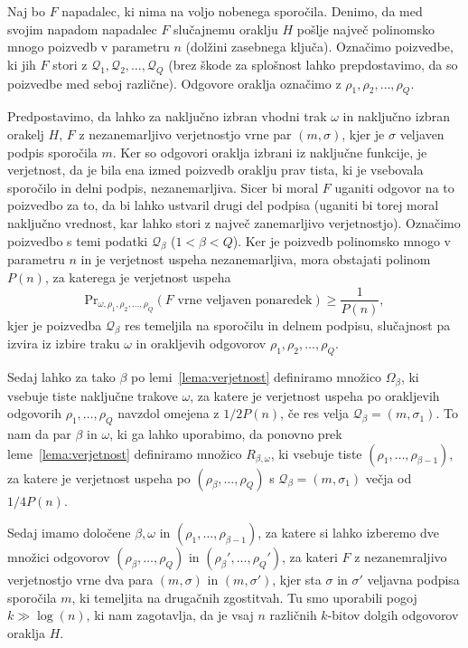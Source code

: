 \documentclass[isrm2, tisk]{fmfdelo}
\begin{document}
\begin{dokaz}
    Naj bo $F$ napadalec, ki nima na voljo nobenega sporočila. Denimo, da med svojim napadom napadalec
    $F$ slučajnemu oraklju $H$ pošlje največ polinomsko mnogo poizvedb v parametru $n$ (dolžini
    zasebnega ključa). Označimo  poizvedbe, ki jih $F$ stori z $\mathcal{Q}_1, \mathcal{Q}_2, \dots,
    \mathcal{Q}_Q$ (brez škode za splošnost lahko prepdostavimo, da so poizvedbe med seboj različne).
    Odgovore oraklja označimo  z $\rho_1, \rho_2 , \dots, \rho_Q$.

    Predpostavimo, da lahko za naključno izbran vhodni trak $\omega$ in naključno izbran orakelj $H$,
    $F$ z nezanemarljivo verjetnostjo vrne par $(m, \sigma)$, kjer je $\sigma$ veljaven podpis
    sporočila $m$. Ker so odgovori oraklja izbrani iz naključne funkcije, je verjetnost, da je bila
    ena izmed poizvedb oraklju prav tista, ki je vsebovala sporočilo in delni podpis, nezanemarljiva.
    Sicer bi moral $F$ uganiti odgovor na to poizvedbo za to, da bi lahko ustvaril drugi del podpisa
    (uganiti bi torej moral naključno vrednost, kar lahko stori z največ zanemarljivo verjetnostjo).
    Označimo poizvedbo s temi podatki $\mathcal{Q}_\beta$ ($1 < \beta < Q$). Ker je poizvedb polinomsko
    mnogo v parametru $n$ in je verjetnost uspeha nezanemarljiva, mora obstajati polinom $P(n)$, za
    katerega je verjetnost uspeha
    $$
    \text{Pr}_{\omega, \rho_1, \rho_2 , \dots, \rho_Q}(\text{$F$ vrne veljaven ponaredek}) \geq \frac{1}{P(n)},
    $$
    kjer je poizvedba $\mathcal{Q}_\beta$ res temeljila na sporočilu in delnem podpisu, slučajnost
    pa izvira iz izbire traku $\omega$ in orakljevih odgovorov $\rho_1, \rho_2, \dots, \rho_Q$.

    Sedaj lahko za tako $\beta$ po lemi~\ref{lema:verjetnost} definiramo množico $\Omega_\beta$, ki
    vsebuje tiste naključne trakove $\omega$, za katere je verjetnost uspeha po orakljevih odgovorih
    $\rho_1, \dots, \rho_Q$ navzdol omejena z $1/2P(n)$, če res velja $\mathcal{Q}_\beta = (m, \sigma_1)$. 
    To nam da par $\beta$ in $\omega$, ki ga lahko uporabimo, da ponovno prek leme~\ref{lema:verjetnost} 
    definiramo množico $R_{\beta, \omega}$, ki vsebuje tiste $(\rho_1, \dots, \rho_{\beta - 1})$, 
    za katere je verjetnost uspeha po $(\rho_\beta, \dots, \rho_Q)$ s $\mathcal{Q}_\beta = (m, \sigma_1)$ 
    večja od $1/4P(n)$.

    Sedaj imamo določene $\beta, \omega$ in $(\rho_1, \dots, \rho_{\beta - 1})$, za katere si lahko
    izberemo dve množici odgovorov $(\rho_\beta, \dots, \rho_Q)$ in $(\rho_\beta', \dots, \rho_Q')$,
    za kateri $F$ z nezanemraljivo verjetnostjo vrne dva para $(m, \sigma)$ in $(m, \sigma')$, kjer
    sta $\sigma$ in $\sigma'$ veljavna podpisa sporočila $m$, ki temeljita na drugačnih zgostitvah.
    Tu smo uporabili pogoj $k \gg \log(n)$, ki nam zagotavlja, da je vsaj $n$ različnih $k$-bitov
    dolgih odgovorov oraklja $H$.


\end{dokaz}
\end{document}
